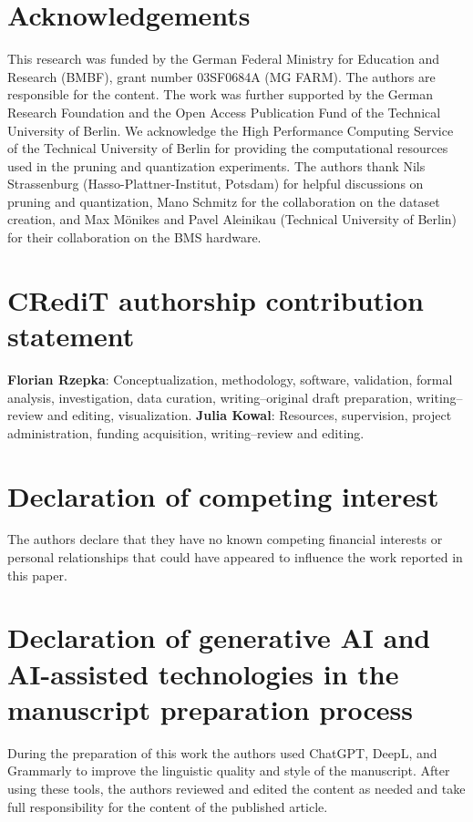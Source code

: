 \documentclass[review]{elsarticle}
\begin{document}
\section*{Acknowledgements}
This research was funded by the German Federal Ministry for Education and Research (BMBF), grant number 03SF0684A (MG FARM). The authors are responsible for the content. The work was further supported by the German Research Foundation and the Open Access Publication Fund of the Technical University of Berlin. We acknowledge the High Performance Computing Service of the Technical University of Berlin for providing the computational resources used in the pruning and quantization experiments. The authors thank Nils Strassenburg (Hasso-Plattner-Institut, Potsdam) for helpful discussions on pruning and quantization, Mano Schmitz for the collaboration on the dataset creation, and Max M\"onikes and Pavel Aleinikau (Technical University of Berlin) for their collaboration on the BMS hardware.

\section*{CRediT authorship contribution statement}
\textbf{Florian Rzepka}: Conceptualization, methodology, software, validation, formal analysis, investigation, data curation, writing--original draft preparation, writing--review and editing, visualization.
\textbf{Julia Kowal}: Resources, supervision, project administration, funding acquisition, writing--review and editing.

\section*{Declaration of competing interest}
The authors declare that they have no known competing financial interests or personal relationships that could have appeared to influence the work reported in this paper.

\section*{Declaration of generative AI and AI-assisted technologies in the manuscript preparation process}
During the preparation of this work the authors used ChatGPT, DeepL, and Grammarly to improve the linguistic quality and style of the manuscript. After using these tools, the authors reviewed and edited the content as needed and take full responsibility for the content of the published article.
\end{document}
